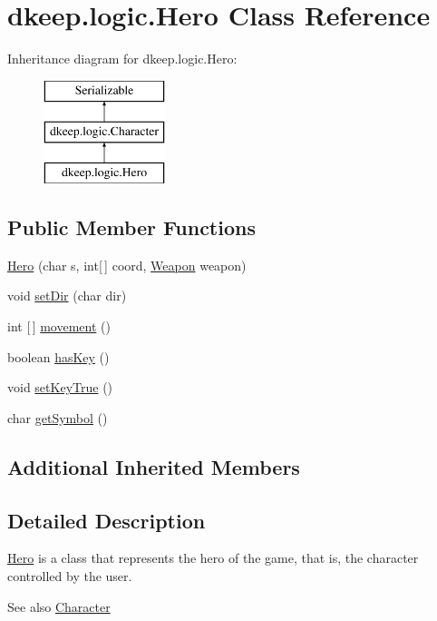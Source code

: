 \hypertarget{classdkeep_1_1logic_1_1_hero}{}\section{dkeep.\+logic.\+Hero Class Reference}
\label{classdkeep_1_1logic_1_1_hero}
Inheritance diagram for dkeep.\+logic.\+Hero\+:\begin{figure}[H]
\begin{center}
\leavevmode
\includegraphics[height=3.000000cm]{classdkeep_1_1logic_1_1_hero}
\end{center}
\end{figure}
\subsection*{Public Member Functions}
\begin{DoxyCompactItemize}
\item 
\hyperlink{classdkeep_1_1logic_1_1_hero_ae74a6e3427b1da89bd52b14cdc632d9b}{Hero} (char s, int\mbox{[}$\,$\mbox{]} coord, \hyperlink{classdkeep_1_1logic_1_1_weapon}{Weapon} weapon)
\item 
void \hyperlink{classdkeep_1_1logic_1_1_hero_a5fb6abc6ce91464833c67f143b4f913b}{set\+Dir} (char dir)
\item 
int \mbox{[}$\,$\mbox{]} \hyperlink{classdkeep_1_1logic_1_1_hero_a5c9eff750321d53e1e4257fd9efd4cd6}{movement} ()
\item 
boolean \hyperlink{classdkeep_1_1logic_1_1_hero_a5fc18a0a10613780cdc6b966dc8810f1}{has\+Key} ()
\item 
void \hyperlink{classdkeep_1_1logic_1_1_hero_a72b13a616bd52ce76b73e6e5e96ccf72}{set\+Key\+True} ()
\item 
char \hyperlink{classdkeep_1_1logic_1_1_hero_afaf5e4c05717a5bdf568c565339e30f6}{get\+Symbol} ()
\end{DoxyCompactItemize}
\subsection*{Additional Inherited Members}


\subsection{Detailed Description}
\hyperlink{classdkeep_1_1logic_1_1_hero}{Hero} is a class that represents the hero of the game, that is, the character controlled by the user. \begin{DoxySeeAlso}{See also}
\hyperlink{classdkeep_1_1logic_1_1_character}{Character} 
\end{DoxySeeAlso}


